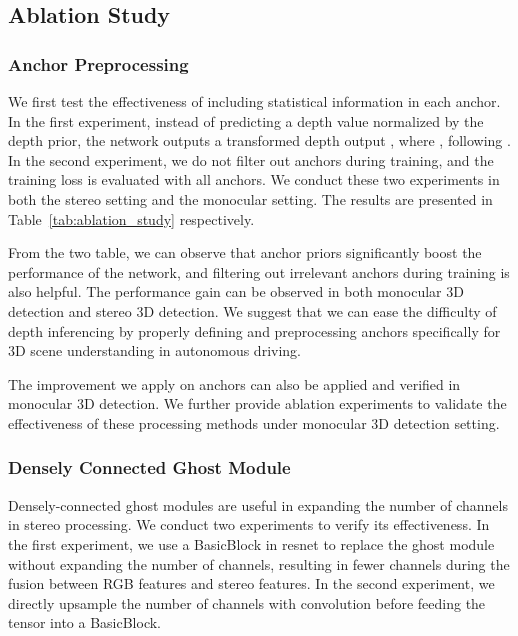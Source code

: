 \documentclass[letterpaper, 10 pt, conference]{ieeeconf}
\begin{document}
\subsection{Ablation Study}

\subsubsection{Anchor Preprocessing}
We first test the effectiveness of including statistical information in each anchor.
In the first experiment, instead of predicting a depth value normalized by the depth prior, the network outputs a transformed depth output , where , following \cite{Chen2020MonoPair}.
In the second experiment, we do not filter out anchors during training, and the training loss is evaluated with all anchors. We conduct these two experiments in both the stereo setting and the monocular setting. The results are presented in Table~\ref{tab:ablation_study} respectively.


From the two table, we can observe that anchor priors significantly boost the performance of the network, and filtering out irrelevant anchors during training is also helpful. 
The performance gain can be observed in both monocular 3D detection and stereo 3D detection.
We suggest that we can ease the difficulty of depth inferencing by properly defining and preprocessing anchors specifically for 3D scene understanding in autonomous driving.

The improvement we apply on anchors can also be applied and verified in monocular 3D detection.
We further provide ablation experiments to validate the effectiveness of these processing methods under monocular 3D detection setting.






\subsubsection{Densely Connected Ghost Module}
Densely-connected ghost modules are useful in expanding the number of channels in stereo processing.
We conduct two experiments to verify its effectiveness.
In the first experiment, we use a BasicBlock in resnet \cite{He2015Resnet} to replace the ghost module without expanding the number of channels, resulting in fewer channels during the fusion between RGB features and stereo features.
In the second experiment, we directly upsample the number of channels with  convolution before feeding the tensor into a BasicBlock. 
\end{document}
